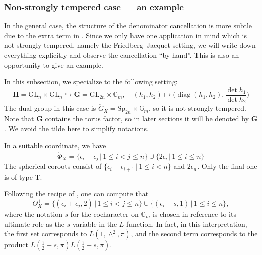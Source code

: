 \documentclass{amsart}
\theoremstyle{definition}
\theoremstyle{remark}
\newcommand{\1}{\mathbf{1}}
\newcommand{\G}{\mathbf{G}}
\newcommand{\GL}{\mathrm{GL}}
\DeclareMathOperator{\diag}{diag}
\theoremstyle{definition}
\renewcommand{\G}{\mathbb{G}}
\newcommand{\bH}{\mathbf{H}}
\newcommand{\bG}{\mathbf{G}}
\begin{document}
\subsubsection{Non-strongly tempered case --- an example}\label{ss:NonST}
In the general case, the structure of the denominator cancellation is more subtle due to the extra term in \cite[(4.16)]{BZSV}. Since we only have one application in mind which is not strongly tempered, namely the Friedberg--Jacquet setting, we will write down everything explicitly and observe the cancellation ``by hand''. This is also an opportunity to give an example.

In this subsection, we specialize to the following setting:
\[
  \bH=\GL_n\times\GL_n\hookrightarrow \bG=\GL_{2n}\times\G_m,\quad (h_1,h_2)\mapsto\Big(\diag(h_1,h_2), \frac{\det h_1}{\det h_2}\Big)\]
The dual group in this case is $\check{G}_X=\mathrm{Sp}_{2n}\times\G_m$, so it is not strongly tempered. Note that $\bG$ contains the torus factor, so in later sections it will be denoted by $\widetilde{\bG}$. We avoid the tilde here to simplify notations.

In a suitable coordinate, we have
\[
  \check{\Phi}_X^+=\{\epsilon_i\pm\epsilon_j\,|\,1\leq i<j\leq n\}\cup\{2\epsilon_i\,|\,1\leq i\leq n\}
\]
The spherical coroots consist of $\{\epsilon_i-\epsilon_{i+1}\,|\,1\leq i<n\}$ and $2\epsilon_n$. Only the final one is of type T.

Following the recipe of \cite[\S 7.1]{SakSpherical}, one can compute that
\[
  \Theta_X^+=\{(\epsilon_i\pm\epsilon_j,2)\,|\,1\leq i<j\leq n\}\cup\{(\epsilon_i\pm s,1)\,|\,1\leq i\leq n\},
\]
where the notation $s$ for the cocharacter on $\G_m$ is chosen in reference to its ultimate role as the $s$-variable in the $L$-function. In fact, in this interpretation, the first set corresponds to $L(1,\wedge^2,\pi)$, and the second term corresponds to the product $L(\frac{1}{2}+s,\pi)L(\frac{1}{2}-s,\pi)$.
\end{document}
